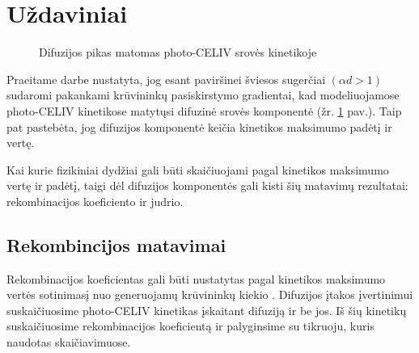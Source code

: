 \section{Uždaviniai}

\begin{figure}
  \centering
  \caption{Difuzijos pikas matomas photo-CELIV srovės kinetikoje}
  \label{fig:celiv_example}
\end{figure}

Praeitame darbe \cite{vytis:kursinis} nustatyta, jog esant paviršinei šviesos sugerčiai $(\alpha d > 1)$ sudaromi pakankami krūvininkų pasiskirstymo gradientai, kad modeliuojamose photo-CELIV kinetikose matytųsi difuzinė srovės komponentė (žr. \ref{fig:celiv_example} pav.). Taip pat pastebėta, jog difuzijos komponentė keičia kinetikos maksimumo padėtį ir vertę.

Kai kurie fizikiniai dydžiai gali būti skaičiuojami pagal kinetikos maksimumo vertę ir padėtį, taigi dėl difuzijos komponentės gali kisti šių matavimų rezultatai: rekombinacijos koeficiento ir judrio.

\subsection{Rekombincijos matavimai}

Rekombinacijos koeficientas gali būti nustatytas pagal kinetikos maksimumo vertės sotinimasį nuo generuojamų krūvininkų kiekio \cite{juška:155202}. Difuzijos įtakos įvertinimui suskaičiuosime photo-CELIV kinetikas įskaitant difuziją ir be jos. Iš šių kinetikų suskaičiuosime rekombinacijos koeficientą ir palyginsime su tikruoju, kuris naudotas skaičiavimuose.

